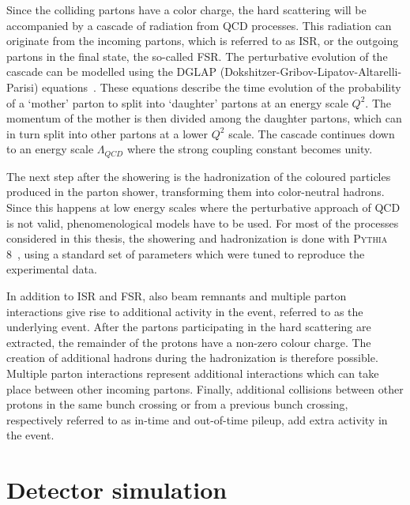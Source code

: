 Since the colliding partons have a color charge, the hard scattering will be accompanied by a cascade of radiation from \acs{QCD} processes. This radiation can originate from the incoming partons, which is referred to as \ac{ISR}, or the outgoing partons in the final state, the so-called \ac{FSR}. The perturbative evolution of the cascade can be modelled using the DGLAP (Dokshitzer-Gribov-Lipatov-Altarelli-Parisi) equations~\cite{Gribov:1972ri, Dokshitzer:1977sg, Altarelli:1977zs}. These equations describe the time evolution of the probability of a `mother' parton to split into `daughter' partons at an energy scale $Q^2$. The momentum of the mother is then divided among the daughter partons, which can in turn split into other partons at a lower $Q^2$ scale. The cascade continues down to an energy scale $\Lambda_{QCD}$ where the strong coupling constant becomes unity.

The next step after the showering is the hadronization of the coloured particles produced in the parton shower, transforming them into color-neutral hadrons. Since this happens at low energy scales where the perturbative approach of \acs{QCD} is not valid, phenomenological models have to be used. For most of the processes considered in this thesis, the showering and hadronization is done with \textsc{Pythia 8}~\cite{Sjostrand:2006za}, using a standard set of parameters which were tuned to reproduce the experimental data. 

In addition to \ac{ISR} and \ac{FSR}, also beam remnants and multiple parton interactions give rise to additional activity in the event, referred to as the underlying event. After the partons participating in the hard scattering are extracted, the remainder of the protons have a non-zero colour charge. The creation of additional hadrons during the hadronization is therefore possible. Multiple parton interactions represent additional interactions which can take place between other incoming partons. Finally, additional collisions between other protons in the same bunch crossing or from a previous bunch crossing, respectively referred to as in-time and out-of-time pileup, add extra activity in the event.

\section{Detector simulation}
\label{sec:sim}

